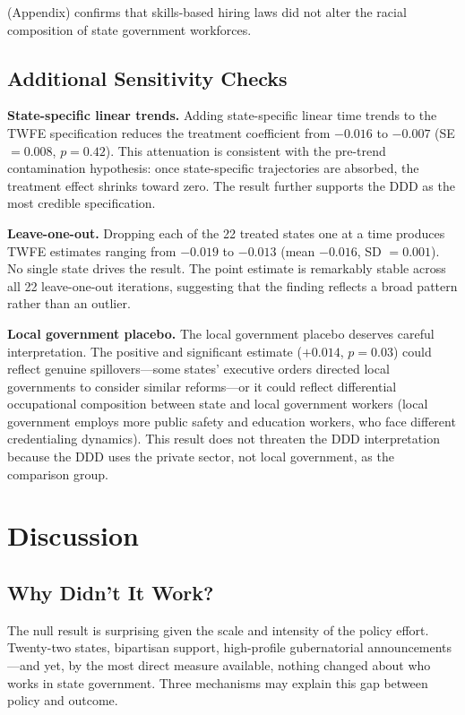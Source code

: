 \documentclass[12pt]{article}
\begin{document}
 (Appendix) confirms that skills-based hiring laws did not alter the racial composition of state government workforces.

\subsection{Additional Sensitivity Checks}

\textbf{State-specific linear trends.} Adding state-specific linear time trends to the TWFE specification reduces the treatment coefficient from $-0.016$ to $-0.007$ (SE $= 0.008$, $p = 0.42$). This attenuation is consistent with the pre-trend contamination hypothesis: once state-specific trajectories are absorbed, the treatment effect shrinks toward zero. The result further supports the DDD as the most credible specification.

\textbf{Leave-one-out.} Dropping each of the 22 treated states one at a time produces TWFE estimates ranging from $-0.019$ to $-0.013$ (mean $-0.016$, SD $= 0.001$). No single state drives the result. The point estimate is remarkably stable across all 22 leave-one-out iterations, suggesting that the finding reflects a broad pattern rather than an outlier.

\textbf{Local government placebo.} The local government placebo deserves careful interpretation. The positive and significant estimate ($+0.014$, $p = 0.03$) could reflect genuine spillovers---some states' executive orders directed local governments to consider similar reforms---or it could reflect differential occupational composition between state and local government workers (local government employs more public safety and education workers, who face different credentialing dynamics). This result does not threaten the DDD interpretation because the DDD uses the private sector, not local government, as the comparison group.


\section{Discussion} \label{sec:discussion}

\subsection{Why Didn't It Work?}

The null result is surprising given the scale and intensity of the policy effort. Twenty-two states, bipartisan support, high-profile gubernatorial announcements---and yet, by the most direct measure available, nothing changed about who works in state government. Three mechanisms may explain this gap between policy and outcome.
\end{document}

